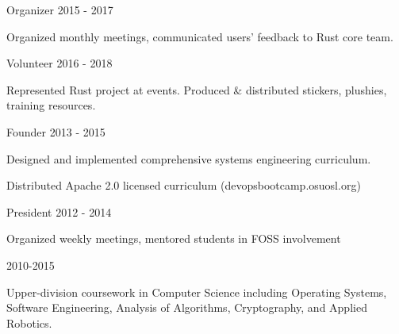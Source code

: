 \documentclass[11pt]{article} %
\begin{document}

\begin{description}
\squish
{}
           {Organizer}
           {2015 - 2017}

Organized monthly meetings, communicated users' feedback to Rust core team.

           {Volunteer}
           {2016 - 2018}

Represented Rust project at events. Produced \& distributed stickers, plushies, training resources.

           {Founder}
           {2013 - 2015}

Designed and implemented comprehensive systems engineering curriculum.

Distributed Apache 2.0 licensed curriculum (devopsbootcamp.osuosl.org)

           {President}
           {2012 - 2014}

Organized weekly meetings, mentored students in FOSS involvement

\end{description}


\begin{description}
\squish
{}
           {}
           {2010-2015}

Upper-division coursework in Computer Science including Operating Systems,\\
Software Engineering, Analysis of Algorithms, Cryptography, and Applied Robotics.

\end{description}

%
%
%
%
%
\end{document}
